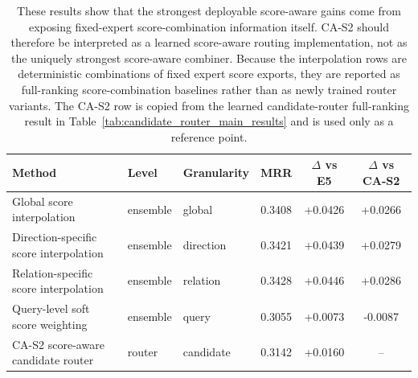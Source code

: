\begin{table}[H]
\centering
\small
\caption{Full-ranking score-aware expert-combination baselines. Ensemble baselines use fixed \texttt{Gate-only} and \texttt{Residual-only} scores, select interpolation policies on the development split, and are evaluated on the test split. CA-S2 is included as the learned candidate-level score-aware router for comparison.}
\label{tab:score_ensemble_baselines}
\setlength{\tabcolsep}{4pt}
\begin{tabular}{p{}p{}p{}ccc}
\toprule
Method & Level & Granularity & MRR & $\Delta$ vs E5 & $\Delta$ vs CA-S2 \\
\midrule
Global score interpolation & ensemble & global & 0.3408 & +0.0426 & +0.0266 \\
Direction-specific score interpolation & ensemble & direction & 0.3421 & +0.0439 & +0.0279 \\
Relation-specific score interpolation & ensemble & relation & 0.3428 & +0.0446 & +0.0286 \\
Query-level soft score weighting & ensemble & query & 0.3055 & +0.0073 & -0.0087 \\
CA-S2 score-aware candidate router & router & candidate & 0.3142 & +0.0160 & -- \\
\bottomrule
\end{tabular}
\vspace{0.4ex}
\caption*{\footnotesize These results show that the strongest deployable score-aware gains come from exposing fixed-expert score-combination information itself. CA-S2 should therefore be interpreted as a learned score-aware routing implementation, not as the uniquely strongest score-aware combiner. Because the interpolation rows are deterministic combinations of fixed expert score exports, they are reported as full-ranking score-combination baselines rather than as newly trained router variants. The CA-S2 row is copied from the learned candidate-router full-ranking result in Table~\ref{tab:candidate_router_main_results} and is used only as a reference point.}
\end{table}

